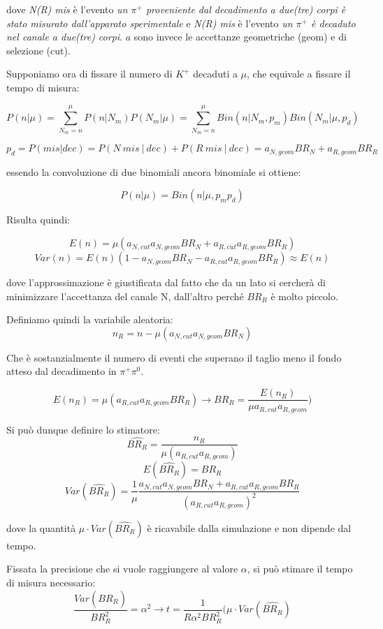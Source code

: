 \documentclass[8pt]{extarticle}
\begin{document}
\justify

dove \textit{N(R) mis} è l'evento \textit{un $\pi^+$ proveniente dal decadimento a due(tre) corpi è stato misurato dall'apparato sperimentale} e \textit{N(R) mis} è l'evento \textit{un $\pi^+$ è decaduto nel canale a due(tre) corpi}. $a$ sono invece le accettanze geometriche (geom) e di selezione (cut).

Supponiamo ora di fissare il numero di $K^+$ decaduti a $\mu$, che equivale a fissare il tempo di misura:

$$
P(n | \mu) = \sum_{N_m = n}^{\mu} P(n | N_m)P(N_m | \mu) = \sum_{N_m = n}^{\mu} Bin(n | N_m, p_m) Bin(N_m | \mu, p_d)
$$

$$
p_d = P(mis | dec) = P(N\ mis\ |\ dec) + P(R\ mis\ |\ dec) = a_{N,geom}BR_N + a_{R, geom}BR_R
$$

essendo la convoluzione di due binomiali ancora binomiale si ottiene: 

$$
P(n | \mu) = Bin(n | \mu, p_m p_d)
$$

Risulta quindi:

$$
E(n) = \mu (a_{N,cut}a_{N,geom}BR_N + a_{R,cut}a_{R,geom}BR_R)
$$
$$
Var(n) = E(n)(1 - a_{N,geom}BR_N - a_{R,cut}a_{R,geom}BR_R) \approx E(n)
$$

dove l'approssimazione è giustificata dal fatto che da un lato si cercherà di minimizzare l'accettanza del canale N, dall'altro perché $BR_R$ è molto piccolo.

Definiamo quindi la variabile aleatoria:
$$
n_R = n - \mu (a_{N,cut}a_{N,geom}BR_N)
$$

Che è sostanzialmente il numero di eventi che superano il taglio meno il fondo atteso dal decadimento in $\pi^+ \pi^0$. 

$$
E(n_R) = \mu (a_{R,cut}a_{R,geom}BR_R) \rightarrow BR_R = \frac{E(n_R)}{\mu a_{R,cut}a_{R,geom}})
$$

Si può dunque definire lo stimatore:
$$
\widehat{BR_R} = \frac{n_R}{\mu (a_{R,cut}a_{R,geom})}
$$
$$
E(\widehat{BR_R}) = BR_R
$$
$$
Var(\widehat{BR_R}) = \frac{1}{\mu} \frac{a_{N,cut}a_{N,geom}BR_N + a_{R,cut}a_{R,geom}BR_R}{(a_{R,cut}a_{R,geom})^2}
$$

dove la quantità $\mu \cdot Var(\widehat{BR_R})$ è ricavabile dalla simulazione e non dipende dal tempo.

Fissata la precisione che si vuole raggiungere al valore $\alpha$, si può stimare il tempo di misura necessario: 
$$
\frac{Var(\widehat{BR_R})}{BR_R^2} = \alpha^2 \rightarrow t = \frac{1}{R \alpha^2 BR_R^2} (\mu \cdot Var(\widehat{BR_R})
$$
\end{document}
